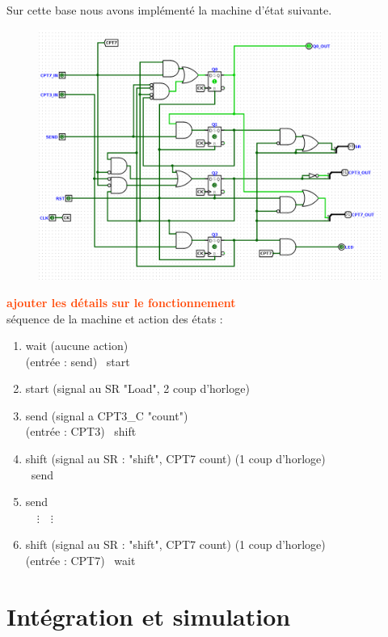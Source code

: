 \documentclass[a4paper]{article} %
\newcommand{\red}[1]{\textbf{\textcolor{OrangeRed}{#1}}}
\begin{document}
\begin{tcolorbox}[colframe=Monokaimagenta,colback=white, breakable, enhanced]
Sur cette base nous avons implémenté la machine d'état suivante.
\begin{figure}[H]
	\centering
	\includegraphics[width=\textwidth]{src/FSM}
	\label{fig:FSM}
\end{figure}

\red{ajouter les détails sur le fonctionnement}\\
séquence de la machine et action des états :
\begin{enumerate}
	\item wait (aucune action)\\
	(entrée : send) \textrightarrow\ start
	\item start (signal au SR "Load", 2 coup d'horloge)
	\item send (signal a CPT3\_C "count")\\
	(entrée : CPT3) \textrightarrow\ shift
	\item shift (signal au SR : "shift", CPT7 count) (1 coup d'horloge)\\
	\textrightarrow\ send
	\item send \\
	$ \quad \vdots \quad \vdots$
	\item shift (signal au SR : "shift", CPT7 count) (1 coup d'horloge)\\
	(entrée : CPT7) \textrightarrow\ wait
\end{enumerate}

\end{tcolorbox}
\section {Intégration et simulation}
\end{document}

